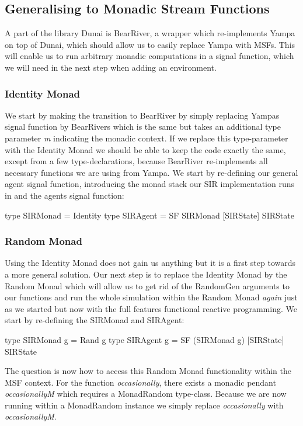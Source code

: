 \subsection{Generalising to Monadic Stream Functions}
A part of the library Dunai is BearRiver, a wrapper which re-implements Yampa on top of Dunai, which should allow us to easily replace Yampa with MSFs. This will enable us to run arbitrary monadic computations in a signal function, which we will need in the next step when adding an environment.

\subsubsection{Identity Monad}
We start by making the transition to BearRiver by simply replacing Yampas signal function by BearRivers which is the same but takes an additional type parameter \textit{m} indicating the monadic context. If we replace this type-parameter with the Identity Monad we should be able to keep the code exactly the same, except from a few type-declarations, because BearRiver re-implements all necessary functions we are using from Yampa. We start by re-defining our general agent signal function, introducing the monad stack our SIR implementation runs in and the agents signal function:

\begin{HaskellCode}
type SIRMonad    = Identity
type SIRAgent    = SF SIRMonad [SIRState] SIRState
\end{HaskellCode}

\subsubsection{Random Monad}
Using the Identity Monad does not gain us anything but it is a first step towards a more general solution. Our next step is to replace the Identity Monad by the Random Monad which will allow us to get rid of the RandomGen arguments to our functions and run the whole simulation within the Random Monad \textit{again} just as we started but now with the full features functional reactive programming.
We start by re-defining the SIRMonad and SIRAgent:

\begin{HaskellCode}
type SIRMonad g = Rand g
type SIRAgent g = SF (SIRMonad g) [SIRState] SIRState
\end{HaskellCode}

The question is now how to access this Random Monad functionality within the MSF context. For the function \textit{occasionally}, there exists a monadic pendant \textit{occasionallyM} which requires a MonadRandom type-class. Because we are now running within a MonadRandom instance we simply replace \textit{occasionally} with \textit{occasionallyM}. 

